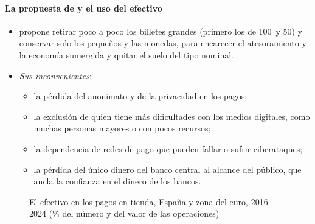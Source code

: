 \documentclass[11pt]{article}
\begin{document}
\paragraph{La propuesta de  y el uso del efectivo}

\begin{itemize}
\item \textcite{Rogoff2016Curse} propone retirar poco a poco los billetes grandes (primero los de 100~y 50) y conservar solo los pequeños y las monedas, para encarecer el atesoramiento y la economía sumergida y quitar el suelo del tipo nominal\nocite{FernandezVillaverde2016Maldicion}.
\item \emph{Sus inconvenientes}:
  \begin{itemize}
  \item la pérdida del anonimato y de la privacidad en los pagos;
  \item la exclusión de quien tiene más dificultades con los medios digitales, como muchas personas mayores o con pocos recursos;
  \item la dependencia de redes de pago que pueden fallar o sufrir ciberataques;
  \item la pérdida del único dinero del banco central al alcance del público, que ancla la confianza en el dinero de los bancos.
  \end{itemize}
\end{itemize}

\begin{figure}[H]
\centering
\caption{El efectivo en los pagos en tienda, España y zona del euro, 2016-2024 (\% del número y del valor de las operaciones)}\label{fig:medios-pago}
\end{figure}
\end{document}
